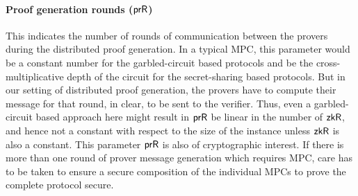 
\paragraph{Proof generation rounds ($\mathsf{prR}$)}
This indicates the number of rounds of communication between the provers during the distributed proof generation. In a typical MPC, this parameter would be a constant number for the garbled-circuit based protocols and be the cross-multiplicative depth of the circuit for the secret-sharing based protocols. But in our setting of distributed proof generation, the provers have to compute their message for that round, in clear, to be sent to the verifier. Thus, even a garbled-circuit based approach here might result in $\mathsf{prR}$ be linear in the number of $\mathsf{zkR}$, and hence not a constant with respect to the size of the instance unless $\mathsf{zkR}$ is also a constant. 
This parameter $\mathsf{prR}$ is also of cryptographic interest. If there is more than one round of prover message generation which requires MPC, care has to be taken to ensure a secure composition of the individual MPCs to prove the complete protocol secure.

